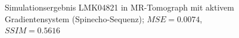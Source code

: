 \begin{figure}[H]
	\centering
	\hfill
	\caption[LMK04821 in MR-Tomograph mit aktivem Gradientensystem (SE) (2)]{Simulationsergebnis LMK04821 in MR-Tomograph mit aktivem Gradientensystem (Spinecho-Sequenz); $MSE=0.0074$, $SSIM=0.5616$}
	\label{fig:resLMKse2}	
\end{figure}

